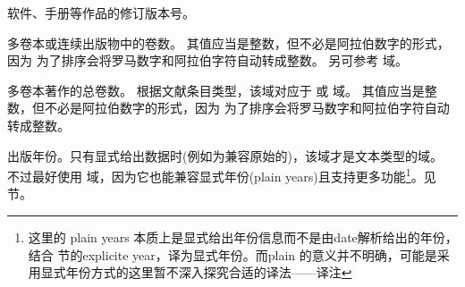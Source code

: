 \begin{fieldlist}



软件、手册等作品的修订版本号。




多卷本或连续出版物中的卷数。
其值应当是整数，但不必是阿拉伯数字的形式，因为 \biber 为了排序会将罗马数字和阿拉伯字符自动转成整数。
另可参考  域。




多卷本著作的总卷数。
根据文献条目类型，该域对应于  或  域。
其值应当是整数，但不必是阿拉伯数字的形式，因为 \biber 为了排序会将罗马数字和阿拉伯字符自动转成整数。






出版年份。只有显式给出数据时(例如为兼容原始的\bibtex)，该域才是文本类型的域。
不过最好使用  域，因为它也能兼容显式年份(plain years)且支持更多功能\footnote{这里的 plain years 本质上是显式给出年份信息而不是由date解析给出的年份，结合 节的explicite year，译为显式年份。而plain \bibtex 的意义并不明确，可能是采用显式年份方式的\bibtex 这里暂不深入探究合适的译法——译注}。见  节。



\end{fieldlist}

